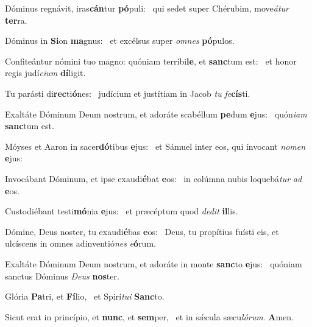 \item Dóminus regnávit, iras\textbf{cán}tur \textbf{pó}puli:~\psstar{} qui sedet super Chérubim, move\textit{átur} \textbf{ter}ra.
\item Dóminus in \textbf{Si}on \textbf{ma}gnus:~\psstar{} et excélsus super \textit{omnes} \textbf{pó}pulos.
\item Confiteántur nómini tuo magno: quóniam terríbi\textbf{le}, et \textbf{sanc}tum est:~\psstar{} et honor regis judí\textit{cium} \textbf{dí}ligit.
\item Tu parásti di\textbf{rec}ti\textbf{ó}nes:~\psstar{} judícium et justítiam in Jacob \textit{tu} \textit{fe}\textbf{cís}ti.
\item Exaltáte Dóminum Deum nostrum, et adoráte scabéllum \textbf{pe}dum \textbf{e}jus:~\psstar{} quón\textit{iam} \textbf{sanc}tum est.
\item Móyses et Aaron in sacer\textbf{dó}tibus \textbf{e}jus:~\psstar{} et Sámuel inter eos, qui ínvocant \textit{nomen} \textbf{e}jus:
\item Invocábant Dóminum, et ipse exaudi\textbf{é}bat \textbf{e}os:~\psstar{} in colúmna nubis loquebá\textit{tur} \textit{ad} \textbf{e}os.
\item Custodiébant testi\textbf{mó}nia \textbf{e}jus:~\psstar{} et præcéptum quod \textit{dedit} \textbf{il}lis.
\item Dómine, Deus noster, tu exaudi\textbf{é}bas \textbf{e}os:~\psstar{} Deus, tu propítius fuísti eis, et ulcíscens in omnes adinventió\textit{nes} \textit{e}\textbf{ó}rum.
\item Exaltáte Dóminum Deum nostrum, et adoráte in monte \textbf{sanc}to \textbf{e}jus:~\psstar{} quóniam sanctus Dóminus \textit{Deus} \textbf{nos}ter.
\item Glória \textbf{Pa}tri, et \textbf{Fí}lio,~\psstar{} et Spirí\textit{tui} \textbf{Sanc}to.
\item Sicut erat in princípio, et \textbf{nunc}, et \textbf{sem}per,~\psstar{} et in sǽcula sæcu\textit{lórum}. \textbf{A}men.

